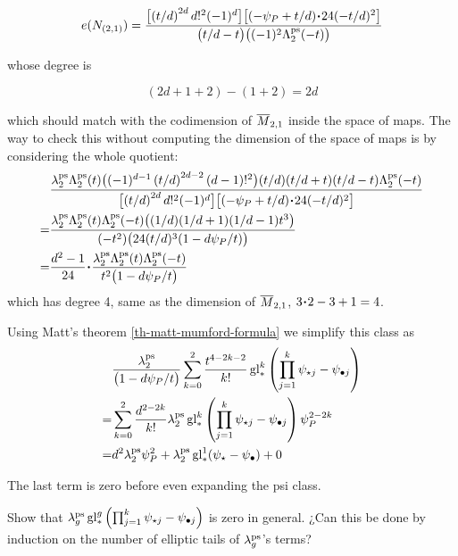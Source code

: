 \documentclass[12pt]{memoir}
\begin{document}
\[e(N_{(2,1)})=\frac{\bigl[\left(t/d\right)^{2d}d!^2(-1)^d\bigr]\bigl[(-\psi_P+t/d)\.24(-t/d)^2\bigr]}{\bigl(t/d-t\bigr)\bigl((-1)^2\La_2^{\ps}(-t)\bigr)}
\]

whose degree is

\[(2d+1+2)-(1+2)=2d\]

which should match with the codimension of \(\overline{M}_{2,1}\) inside the space of maps. The way to check this without computing the dimension of the space of maps is by considering the whole quotient:
\begin{align*}
      & \frac{\la_2^{\ps}\La_2^{\ps}(t)\bigl((-1)^{d-1}\left({t}/{d}\right)^{2d-2}(d-1)!^2\bigr)(t/d)(t/d+t)(t/d-t)\La_2^{\ps}(-t)}{\bigl[\left(t/d\right)^{2d}d!^2(-1)^d\bigr]\bigl[(-\psi_P+t/d)\.24(-t/d)^2\bigr]} \\
    = & \frac{\la_2^{\ps}\La_2^{\ps}(t)\La_2^{\ps}(-t)\bigl((1/d)(1/d+1)(1/d-1)t^3\bigr)}{(-t^2)\bigl(24(t/d)^3(1-d\psi_P/t)\bigr)}                                                                                   \\
    = & \frac{d^2-1}{24}\.\frac{\la_2^{\ps}\La_2^{\ps}(t)\La_2^{\ps}(-t)}{t^2\bigl(1-d\psi_P/t\bigr)}                                                                                                                 \\
\end{align*}
which has degree 4, same as the dimension of \(\overline{M}_{2,1}\), \(3\.2-3+1=4\).\par
Using Matt's theorem \ref{th-matt-mumford-formula} we simplify this class as
\begin{align*}
      & \frac{\lambda_2^{\operatorname{\mathrm{ps}}}}{\bigl(1-d\psi_P/t\bigr)}\sum_{k=0}^{2}\frac{t^{4-2k-2}}{k!}\operatorname{gl}_{\ast}^k\left(\prod_{j=1}^{k}\psi_{\star j}-\psi_{\bullet j}\right) \\
    = & \sum_{k=0}^{2}\frac{d^{2-2k}}{k!}\lambda_2^{\operatorname{\mathrm{ps}}}\operatorname{gl}_{\ast}^k\left(\prod_{j=1}^{k}\psi_{\star j}-\psi_{\bullet j}\right)\psi_P^{2-2k}                      \\
    = & d^2\lambda_2^{\operatorname{\mathrm{ps}}}\psi_P^2+\lambda_2^{\operatorname{\mathrm{ps}}}\operatorname{gl}_\ast^{1}(\psi_\star-\psi_\bullet)+0
\end{align*}

\begin{Rmk}
    The last term is zero before even expanding the psi class.
\end{Rmk}

\begin{Ej}
    Show that \(\lambda_g^{\operatorname{\mathrm{ps}}}\operatorname{gl}_{\ast}^g\left(\prod_{j=1}^{k}\psi_{\star j}-\psi_{\bullet j}\right)\) is zero in general. ¿Can this be done by induction on the number of elliptic tails of \(\lambda_g^{\operatorname{\mathrm{ps}}}\)'s terms?
\end{Ej}
\end{document}
